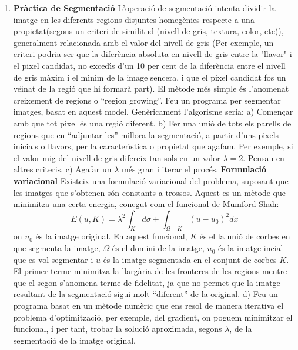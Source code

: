\documentclass[11pt]{article}
\begin{document}
\begin{enumerate}
\item
{\bf Pr\`{a}ctica de Segmentaci\'{o}} L'operaci\'{o} de segmentaci\'{o} intenta dividir la imatge en les diferents
regions disjuntes homeg\`{e}nies respecte a una propietat(segons un criteri de similitud (nivell de
gris, textura, color, etc)), generalment relacionada amb el valor del nivell de gris (Per exemple,
un criteri podria ser que la difer\`{e}ncia absoluta en nivell de gris entre la "llavor" i el pixel
candidat, no exced\'{\i}s d'un 10 per cent de la difer\`{e}ncia entre el nivell de gris m\`{a}xim i el m\'{\i}nim de
la image sencera, i que el pixel candidat fos un ve\"{\i}nat de la regi\'{o} que hi formar\`{a} part). El m\`{e}tode
m\'{e}s simple \'{e}s l'anomenat creixement de regions o ``region growing''.  Feu un
programa per segmentar imatges, basat en aquest model. Gen\`{e}ricament l'algorisme seria:
\newline
a) Comen\c car amb que tot pixel \'{e}s una regi\'{o} diferent.
\newline
b) Fer una uni\'{o} de tots els parells de regions que en ``adjuntar-les'' millora la segmentaci\'{o}, a
partir d'uns pixels inicials o llavors, per la caracter\'{\i}stica o propietat que agafam. Per exemple,
si el valor mig del nivell de gris difereix tan sols en un valor $\lambda =2$. Pensau en altres
criteris.
\newline
c) Agafar un $\lambda$ m\'{e}s gran i iterar el proc\'{e}s.
\newline
{\bf  Formulaci\'{o} variacional} Existeix una formulaci\'{o} variacional del problema, suposant que les
imatges que s'obtenen s\'{o}n constants a trossos. Aquest es un m\`{e}tode que minimitza una certa energia,
conegut com el funcional de Mumford-Shah:
$$E(u,K)=\lambda^2 \int_{K} d\sigma + \int_{\Omega-K}(u-u_{0})^2dx$$
on $u_{0}$ \'{e}s la imatge original. En aquest funcional, $K$ \'{e}s el la uni\'{o} de corbes en que segmenta
la imatge, $\Omega$ \'{e}s el domini de la imatge, $u_{0}$ \'{e}s la imatge incial que es vol segmentar i
$u$ \'{e}s la imatge segmentada en el conjunt de corbes $K$.
 El primer terme minimitza la
llarg\`{a}ria de les fronteres de les regions mentre que el segon s'anomena terme de fidelitat, ja que
no permet que la imatge resultant de la segmentaci\'{o} sigui molt ``diferent'' de la original.
 d) Feu un programa basat en un m\`{e}tode num\`{e}ric que ens resol de manera iterativa
el problema d'optimitzaci\'{o}, per exemple, del gradient, on poguem minimitzar el funcional, i per
tant, trobar la soluci\'{o} aproximada, segons $\lambda$, de la segmentaci\'{o} de la imatge original.




\end{enumerate}
\end{document}
